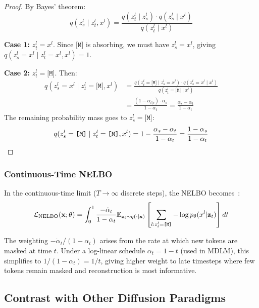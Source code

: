\begin{proof}
By Bayes' theorem:
\begin{equation}
    q(z^l_s \mid z^l_t, x^l) = \frac{q(z^l_t \mid z^l_s) \cdot q(z^l_s \mid x^l)}{q(z^l_t \mid x^l)}
\end{equation}

\textbf{Case 1:} $z^l_t = x^l$. Since $\texttt{[M]}$ is absorbing, we must have $z^l_s = x^l$, giving $q(z^l_s = x^l \mid z^l_t = x^l, x^l) = 1$.

\textbf{Case 2:} $z^l_t = \texttt{[M]}$. Then:
\begin{align}
    q(z^l_s = x^l \mid z^l_t = \texttt{[M]}, x^l) &= \frac{q(z^l_t = \texttt{[M]} \mid z^l_s = x^l) \cdot q(z^l_s = x^l \mid x^l)}{q(z^l_t = \texttt{[M]} \mid x^l)} \\
    &= \frac{(1 - \alpha_{t|s}) \cdot \alpha_s}{1 - \alpha_t} = \frac{\alpha_s - \alpha_t}{1 - \alpha_t}
\end{align}
The remaining probability mass goes to $z^l_s = \texttt{[M]}$:
\begin{equation}
    q(z^l_s = \texttt{[M]} \mid z^l_t = \texttt{[M]}, x^l) = 1 - \frac{\alpha_s - \alpha_t}{1 - \alpha_t} = \frac{1 - \alpha_s}{1 - \alpha_t} \qedhere
\end{equation}
\end{proof}

\subsubsection{Continuous-Time NELBO}

In the continuous-time limit ($T \to \infty$ discrete steps), the NELBO becomes~\citep{campbell2022continuous,mdlm}:
\begin{equation}
    \mathcal{L}_{\text{NELBO}}(\mathbf{x};\theta) = \int_0^1 \frac{-\dot\alpha_t}{1-\alpha_t} \mathbb{E}_{\mathbf{z}_t \sim q(\cdot|\mathbf{x})}\left[\sum_{l:z^l_t=\texttt{[M]}} -\log p_\theta(x^l | \mathbf{z}_t)\right] dt
\end{equation}

The weighting $-\dot\alpha_t/(1-\alpha_t)$ arises from the rate at which new tokens are masked at time $t$. Under a log-linear schedule $\alpha_t = 1-t$ (used in MDLM), this simplifies to $1/(1-\alpha_t) = 1/t$, giving higher weight to late timesteps where few tokens remain masked and reconstruction is most informative.

\subsection{Contrast with Other Diffusion Paradigms}
\label{app:contrast}

